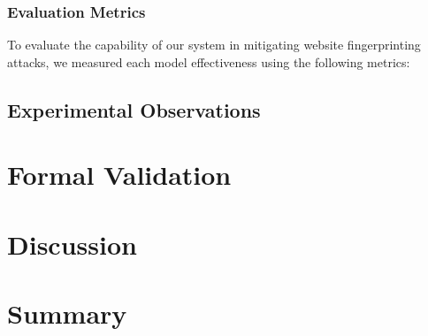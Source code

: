 \subsubsection{Evaluation Metrics}
To evaluate the capability of our system in mitigating website fingerprinting attacks, we measured each model effectiveness using the following metrics: 

\subsection{Experimental Observations}\label{sec:experimental_observations_unobservability}

\section{Formal Validation}\label{sec:formal_validation}

\section{Discussion}\label{sec:validation_discussion}

\section{Summary}\label{sec:validation_summary}
